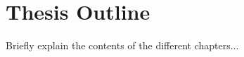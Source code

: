 \section{Thesis Outline}
\label{section:outline}

Briefly explain the contents of the different chapters...

